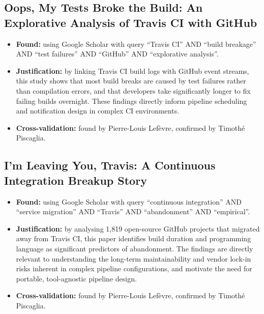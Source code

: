 \documentclass[a4paper,11pt,oneside]{article}
\begin{document}
\subsection{Oops, My Tests Broke the Build: An Explorative Analysis of Travis CI with GitHub \cite{Beller2017}}
%
\begin{itemize}
    \item \textbf{Found:} using Google Scholar with query ``Travis CI'' AND ``build breakage'' AND ``test failures'' AND ``GitHub'' AND ``explorative analysis''.
    \item \textbf{Justification:} by linking Travis CI build logs with GitHub event streams, this study shows that most build breaks are caused by test failures rather than compilation errors, and that developers take significantly longer to fix failing builds overnight. These findings directly inform pipeline scheduling and notification design in complex CI environments.
    \item \textbf{Cross-validation:} found by Pierre-Louis Lef\`{e}vre, confirmed by Timoth\'{e} Piscaglia.
\end{itemize}

\subsection{I'm Leaving You, Travis: A Continuous Integration Breakup Story \cite{Widder2018}}
%
\begin{itemize}
    \item \textbf{Found:} using Google Scholar with query ``continuous integration'' AND ``service migration'' AND ``Travis'' AND ``abandonment'' AND ``empirical''.
    \item \textbf{Justification:} by analysing 1,819 open-source GitHub projects that migrated away from Travis CI, this paper identifies build duration and programming language as significant predictors of abandonment. The findings are directly relevant to understanding the long-term maintainability and vendor lock-in risks inherent in complex pipeline configurations, and motivate the need for portable, tool-agnostic pipeline design.
    \item \textbf{Cross-validation:} found by Pierre-Louis Lef\`{e}vre, confirmed by Timoth\'{e} Piscaglia.
\end{itemize}

\end{document}
